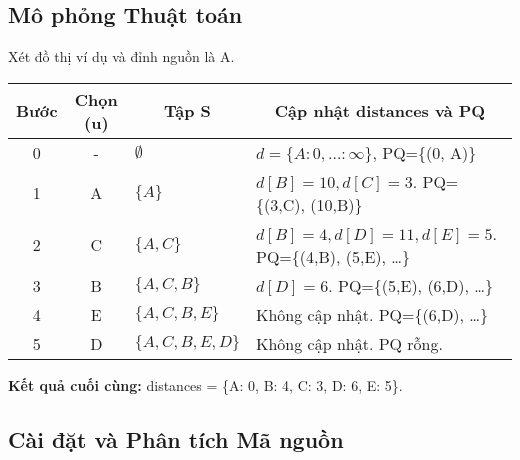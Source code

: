 \documentclass[a4paper,12pt]{article}
\begin{document}
\subsection{Mô phỏng Thuật toán}
Xét đồ thị ví dụ và đỉnh nguồn là A.
\begin{center}
\begin{tabular}{|c|c|l|l|}
\hline
\textbf{Bước} & \textbf{Chọn (u)} & \multicolumn{1}{c|}{\textbf{Tập S}} & \multicolumn{1}{c|}{\textbf{Cập nhật distances và PQ}} \\ \hline
0 & - & $\emptyset$ & $d=\{A:0, \dots:\infty\}$, PQ=\{(0, A)\} \\ \hline
1 & A & $\{A\}$ & $d[B]=10, d[C]=3$. PQ=\{(3,C), (10,B)\} \\ \hline
2 & C & $\{A, C\}$ & $d[B]=4, d[D]=11, d[E]=5$. PQ=\{(4,B), (5,E), \dots\} \\ \hline
3 & B & $\{A, C, B\}$ & $d[D]=6$. PQ=\{(5,E), (6,D), \dots\} \\ \hline
4 & E & $\{A, C, B, E\}$ & Không cập nhật. PQ=\{(6,D), \dots\} \\ \hline
5 & D & $\{A, C, B, E, D\}$ & Không cập nhật. PQ rỗng. \\ \hline
\end{tabular}
\end{center}
\textbf{Kết quả cuối cùng:} distances = \{A: 0, B: 4, C: 3, D: 6, E: 5\}.

\subsection{Cài đặt và Phân tích Mã nguồn}
\end{document}
